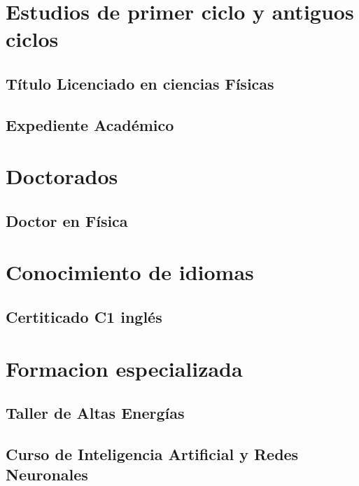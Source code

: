 \documentclass[a4paper, 11pt, twoside, openright]{report}
\begin{document}
\section{Estudios de primer ciclo y antiguos ciclos}
\subsection{Título Licenciado en ciencias Físicas}

\subsection{Expediente Académico}


\section{Doctorados}

\subsection{Doctor en Física}


\section{Conocimiento de idiomas}

\subsection{Certiticado C1 inglés}


\section{Formacion especializada}

\subsection{Taller de Altas Energías}


\subsection{Curso de Inteligencia Artificial y Redes Neuronales}

\end{document}
